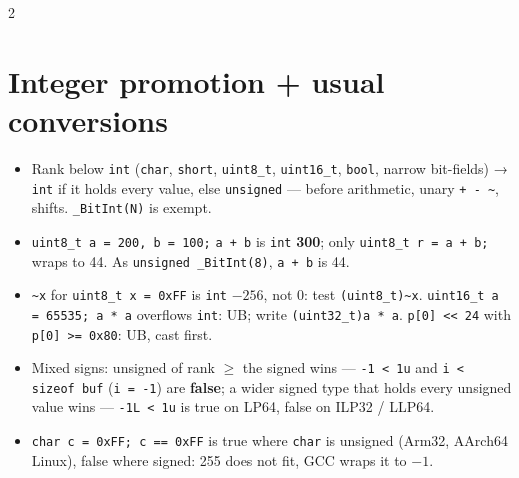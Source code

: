 \documentclass[8pt]{extarticle}
\newcommand\ct[1]{\texttt{#1}}
\begin{document}
\begin{multicols}{2}
\section{Integer promotion + usual conversions}
\begin{itemize}
  \item Rank below \ct{int} (\ct{char}, \ct{short}, \ct{uint8\_t}, \ct{uint16\_t}, \ct{bool},
        narrow bit-fields) → \ct{int} if it holds every value, else \ct{unsigned} — before
        arithmetic, unary \ct{+ - \textasciitilde}, shifts. \ct{\_BitInt(N)} is exempt.
  \item \ct{uint8\_t a = 200, b = 100;} \ct{a + b} is \ct{int} \textbf{300}; only
        \ct{uint8\_t r = a + b;} wraps to 44. As \ct{unsigned \_BitInt(8)}, \ct{a + b} is 44.
  \item \ct{\textasciitilde x} for \ct{uint8\_t x = 0xFF} is \ct{int} $-256$, not 0: test
        \ct{(uint8\_t)\textasciitilde x}. \ct{uint16\_t a = 65535; a * a} overflows \ct{int}:
        UB; write \ct{(uint32\_t)a * a}. \ct{p[0] << 24} with \ct{p[0] >= 0x80}: UB, cast first.
  \item Mixed signs: unsigned of rank $\ge$ the signed wins — \ct{-1 < 1u} and
        \ct{i < sizeof buf} (\ct{i = -1}) are \textbf{false}; a wider signed type that holds every
        unsigned value wins — \ct{-1L < 1u} is true on LP64, false on ILP32 / LLP64.
  \item \ct{char c = 0xFF; c == 0xFF} is true where \ct{char} is unsigned (Arm32, AArch64
        Linux), false where signed: 255 does not fit, GCC wraps it to $-1$.
\end{itemize}

\end{multicols}

\end{document}
